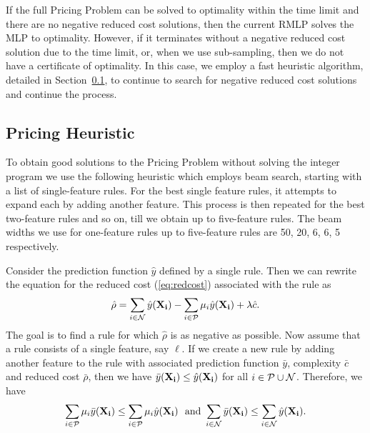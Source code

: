 \documentclass[twoside,11pt]{article}
\begin{document}
If the full  Pricing Problem can be solved to optimality within the time limit and there are no negative reduced cost solutions, then the current RMLP solves the MLP to optimality. However, if it terminates without a negative reduced cost solution due to the time limit, or, when we use sub-sampling, then we do not have a certificate of optimality. In this case, we employ a fast heuristic algorithm, detailed in Section~\ref{sec:heuristic}, to continue to search for negative reduced cost solutions and continue the process.

\subsection{Pricing Heuristic}  \label{sec:heuristic}
To obtain good solutions to the Pricing Problem without solving the integer program we use the following heuristic which employs beam search, starting with a list of single-feature rules. For the best single feature rules, it attempts to expand each by adding another feature. This process is then repeated for the best two-feature rules and so on, till we obtain up to five-feature rules.
The beam widths we use for one-feature rules up to five-feature rules are 50, 20, 6, 6, 5 respectively.

Consider the prediction function $\hat y$ defined by a single rule. Then we can rewrite the equation for the reduced cost (\ref{eq:redcost}) associated with the rule as
\begin{equation}\label{rule-red} \hat\rho = \sum_{i \in \cal N} \hat y ({\bf X_i}) - \sum_{i \in \cal P} \mu_i\hat y({\bf X_i}) + \lambda \hat c.
\end{equation}
The goal is to find a rule for which $\hat \rho$ is as negative as possible.
Now assume that a rule consists of a single feature, say $\ell$. If we create a new rule by adding another feature to the rule with associated prediction function $\bar y$, complexity $\bar c$ and reduced cost $\bar \rho$,  then we have $\bar y({\bf X_i}) \leq \hat y({\bf X_i})$ for all $i \in \cal P \cup \cal N$. 
 Therefore, we have
\[ \sum_{i \in \cal P} \mu_i \bar y({\bf X_i}) \leq \sum_{i \in \cal P} \mu_i \hat y({\bf X_i}) \mbox{~ and }  \sum_{i \in \cal N} \bar y({\bf X_i}) \leq \sum_{i \in \cal N} \hat y(\bf X_i).\]

\end{document}
